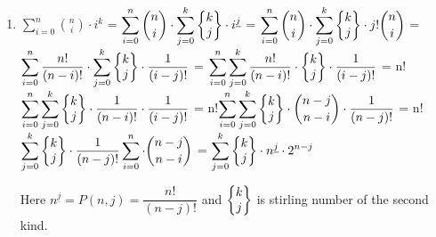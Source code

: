 \begin{enumerate}
            
            \item 
                $\displaystyle \sum_{i=0}^{n} {n \choose i } \cdot i^{k}$
                    = $\displaystyle \sum_{i=0}^{n} {n \choose i } \cdot \sum_{j=0}^{k}{ \left\{ \begin{matrix} k\cr j
                    \end{matrix} \right\} \cdot i^{\underline{j}}}$
                    = $\displaystyle \sum_{i=0}^{n} {n \choose i } \cdot \sum_{j=0}^{k} \left\{ \begin{matrix} k\cr j
                    \end{matrix} \right\} \cdot j! {n \choose i }$
                    = $\displaystyle \sum_{i=0}^{n} \frac{n!}{(n-i)!} \cdot \sum_{j=0}^{k} \left\{ \begin{matrix}k\cr j
                    \end{matrix} \right\} \cdot \frac{1}{(i-j)!}$
                    = $\displaystyle \sum_{i=0}^{n} \sum_{j=0}^{k} \frac{n!}{(n-i)!} \cdot \left\{\begin{matrix} k\cr j
                    \end{matrix} \right\} \cdot \frac{1}{(i-j)!}$
                    = n!$\displaystyle \sum_{i=0}^{n} \sum_{j=0}^{k} \left\{ \begin{matrix} k\cr j \end{matrix} \right\}
                    \cdot
                    \frac{1}{(n-i)!} \cdot \frac{1}{(i-j)!}$
                    = n!$\displaystyle \sum_{i=0}^{n} \sum_{j=0}^{k} \left\{ \begin{matrix} k\cr j \end{matrix} \right\}
                    \cdot {
                    n-j \choose n-i} \cdot \frac{1}{(n-j)!}$
                    = n!$\displaystyle \sum_{j=0}^{k} \left\{ \begin{matrix} k\cr j \end{matrix} \right\} \cdot
                    \frac{1}{(n-j)!}
                    \sum_{i=0}^{n} \cdot { n-j \choose n-i}$
                    = $\displaystyle \sum_{j=0}^{k} \left\{\begin{matrix} k\cr j \end{matrix} \right\} \cdot
                    n^{\underline{j}}
                    \cdot 2^{n-j}$

                Here $n^{\underline{j}}=P(n,j)=\dfrac{n!}{(n-j)!}$ and $\displaystyle \left\{ \begin{matrix} k\cr j
                    \end{matrix} \right\}$ is stirling number of the second kind.


\end{enumerate}

